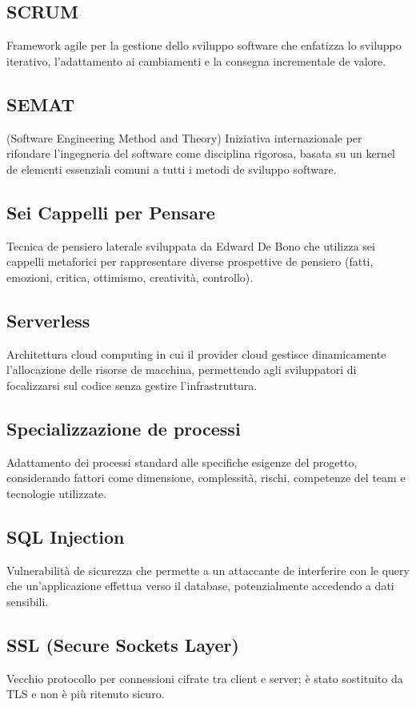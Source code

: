 \documentclass[a4paper,11pt]{article}
\begin{document}
\subsection{SCRUM}
Framework agile per la gestione dello sviluppo software che enfatizza lo sviluppo iterativo, l'adattamento ai cambiamenti e la consegna incrementale de valore.

\subsection{SEMAT}
(Software Engineering Method and Theory) Iniziativa internazionale per rifondare l'ingegneria del software come disciplina rigorosa, basata su un kernel de elementi essenziali comuni a tutti i metodi de sviluppo software.

\subsection{Sei Cappelli per Pensare}
Tecnica de pensiero laterale sviluppata da Edward De Bono che utilizza sei cappelli metaforici per rappresentare diverse prospettive de pensiero (fatti, emozioni, critica, ottimismo, creatività, controllo).

\subsection{Serverless}
Architettura cloud computing in cui il provider cloud gestisce dinamicamente l'allocazione delle risorse de macchina, permettendo agli sviluppatori di focalizzarsi sul codice senza gestire l'infrastruttura.

\subsection{Specializzazione de processi}
Adattamento dei processi standard alle specifiche esigenze del progetto, considerando fattori come dimensione, complessità, rischi, competenze del team e tecnologie utilizzate.

\subsection{SQL Injection}
Vulnerabilità de sicurezza che permette a un attaccante de interferire con le query che un'applicazione effettua verso il database, potenzialmente accedendo a dati sensibili.

\subsection{SSL (Secure Sockets Layer)}
Vecchio protocollo per connessioni cifrate tra client e server; è stato sostituito da TLS e non è più ritenuto sicuro.
\end{document}
